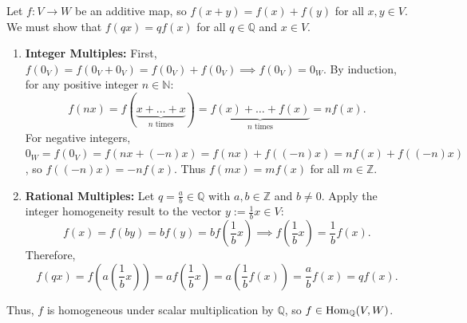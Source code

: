 \begin{exercisesolution}
\label{sol:additive_maps_over_rationals}
Let $f \colon V \to W$ be an additive map, so $f(x + y) = f(x) + f(y)$ for all $x, y \in V$. We must show that $f(q x) = q f(x)$ for all $q \in \mathbb{Q}$ and $x \in V$.

\begin{enumerate}[label=\textbf{(\alph*)}]
    \item \textbf{Integer Multiples:}
    First, $f(0_V) = f(0_V + 0_V) = f(0_V) + f(0_V) \implies f(0_V) = 0_W$.
    By induction, for any positive integer $n \in \mathbb{N}$:
    \[
    f(n x) = f(\underbrace{x + \dots + x}_{n \text{ times}}) = \underbrace{f(x) + \dots + f(x)}_{n \text{ times}} = n f(x).
    \]
    For negative integers, $0_W = f(0_V) = f(n x + (-n)x) = f(n x) + f((-n)x) = n f(x) + f((-n)x)$, so $f((-n)x) = -n f(x)$.
    Thus $f(m x) = m f(x)$ for all $m \in \mathbb{Z}$.

    \item \textbf{Rational Multiples:}
    Let $q = \frac{a}{b} \in \mathbb{Q}$ with $a, b \in \mathbb{Z}$ and $b \ne 0$.
    Apply the integer homogeneity result to the vector $y := \frac{1}{b} x \in V$:
    \[
    f(x) = f(b y) = b f(y) = b f\left(\frac{1}{b} x\right) \implies f\left(\frac{1}{b} x\right) = \frac{1}{b} f(x).
    \]
    Therefore,
    \[
    f(q x) = f\left(a \left(\frac{1}{b} x\right)\right) = a f\left(\frac{1}{b} x\right) = a \left(\frac{1}{b} f(x)\right) = \frac{a}{b} f(x) = q f(x).
    \]
\end{enumerate}
Thus, $f$ is homogeneous under scalar multiplication by $\mathbb{Q}$, so $f \in \operatorname{Hom}_{\mathbb{Q}}(V, W)$.
\end{exercisesolution}

